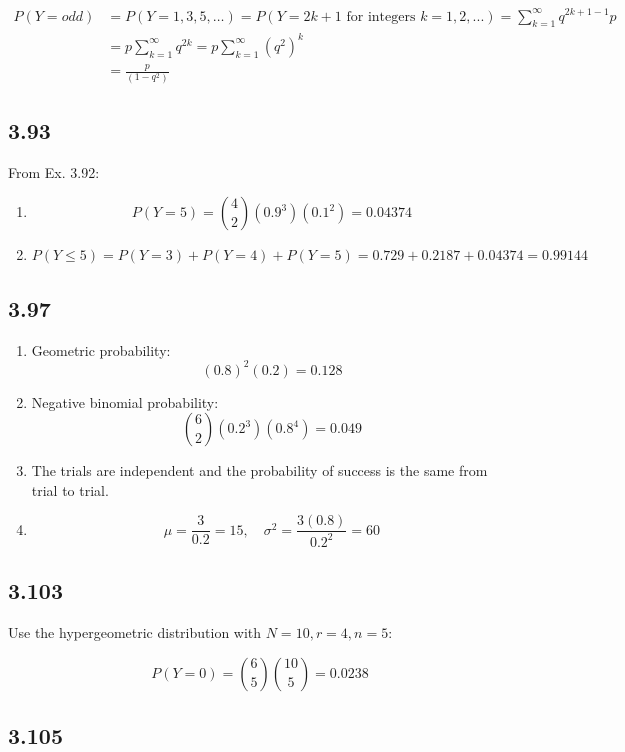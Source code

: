 \documentclass[
  letterpaper,
  DIV=11,
  numbers=noendperiod]{scrartcl}
\begin{document}
\[
\begin{aligned}
P(Y = odd) &= P(Y = 1, 3, 5, \ldots) = P(Y = 2k + 1 \text{ for integers } k = 1, 2, ...)= \sum_{k = 1}^{\infty} q^{2k + 1 - 1}p \\
&= p \sum_{k = 1}^{\infty} q^{2k} = p \sum_{k = 1}^{\infty} (q^2)^{k}\\
&= \frac{p}{(1-q^2)}
\end{aligned}
\]

\subsection{3.93}\label{section-4}

From Ex. 3.92:

\begin{enumerate}
\def\labelenumi{(\alph{enumi})}
\item
  \[P(Y = 5) = \binom{4}{2} (0.9^3)(0.1^2) = 0.04374\]
\item
  \[P(Y \leq 5) = P(Y=3) + P(Y=4) + P(Y=5) = 0.729 + 0.2187 + 0.04374 = 0.99144\]
\end{enumerate}

\subsection{3.97}\label{section-5}

\begin{enumerate}
\def\labelenumi{(\alph{enumi})}
\item
  Geometric probability: \[(0.8)^2 (0.2) = 0.128\]
\item
  Negative binomial probability: \[\binom{6}{2} (0.2^3)(0.8^4) = 0.049\]
\item
  The trials are independent and the probability of success is the same
  from trial to trial.
\item
  \[\mu = \frac{3}{0.2} = 15, \quad \sigma^2 = \frac{3(0.8)}{0.2^2} = 60\]
\end{enumerate}

\subsection{3.103}\label{section-6}

Use the hypergeometric distribution with \(N=10, r=4, n=5\):

\[P(Y=0) = \binom{6}{5}\binom{10}{5} = 0.0238\]

\subsection{3.105}\label{section-7}
\end{document}
